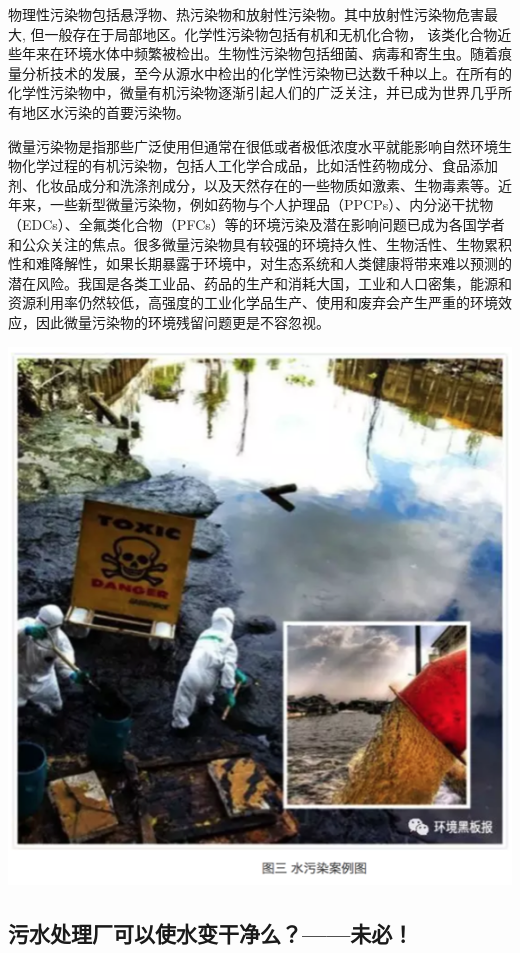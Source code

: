 \documentclass[]{book}
\begin{document}
物理性污染物包括悬浮物、热污染物和放射性污染物。其中放射性污染物危害最大, 但一般存在于局部地区。化学性污染物包括有机和无机化合物， 该类化合物近些年来在环境水体中频繁被检出。生物性污染物包括细菌、病毒和寄生虫。随着痕量分析技术的发展，至今从源水中检出的化学性污染物已达数千种以上。在所有的化学性污染物中，微量有机污染物逐渐引起人们的广泛关注，并已成为世界几乎所有地区水污染的首要污染物。

微量污染物是指那些广泛使用但通常在很低或者极低浓度水平就能影响自然环境生物化学过程的有机污染物，包括人工化学合成品，比如活性药物成分、食品添加剂、化妆品成分和洗涤剂成分，以及天然存在的一些物质如激素、生物毒素等。近年来，一些新型微量污染物，例如药物与个人护理品（PPCPs）、内分泌干扰物（EDCs）、全氟类化合物（PFCs）等的环境污染及潜在影响问题已成为各国学者和公众关注的焦点。很多微量污染物具有较强的环境持久性、生物活性、生物累积性和难降解性，如果长期暴露于环境中，对生态系统和人类健康将带来难以预测的潜在风险。我国是各类工业品、药品的生产和消耗大国，工业和人口密集，能源和资源利用率仍然较低，高强度的工业化学品生产、使用和废弃会产生严重的环境效应，因此微量污染物的环境残留问题更是不容忽视。

\includegraphics[width=7.81in]{images/dushui3}

\hypertarget{ux6c61ux6c34ux5904ux7406ux5382ux53efux4ee5ux4f7fux6c34ux53d8ux5e72ux51c0ux4e48ux672aux5fc5}{%
\subsection{污水处理厂可以使水变干净么？------未必！}\label{ux6c61ux6c34ux5904ux7406ux5382ux53efux4ee5ux4f7fux6c34ux53d8ux5e72ux51c0ux4e48ux672aux5fc5}}
\end{document}
